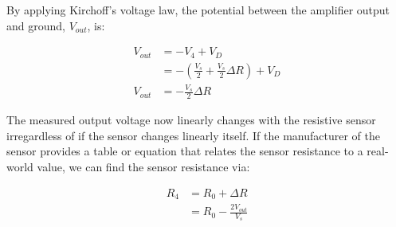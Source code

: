 By applying Kirchoff's voltage law, the potential between the amplifier output and ground, $V_{out} $, is:

\begin{align*}
    V_{out} &= -V_4 + V_D \\
            &= -\left( \frac{V_s}{2} + \frac{V_s}{2} \Delta R\right) + V_D \\
    V_{out} &= -\frac{V_s}{2} \Delta R
\end{align*}

The measured output voltage now linearly changes with the resistive sensor irregardless of if the sensor changes linearly itself.
If the manufacturer of the sensor provides a table or equation that relates the sensor resistance to a real-world value, we can find the sensor resistance via:

\begin{align*}
    R_4 &= R_0 + \Delta R \\
        &= R_0 - \frac{2V_{out}}{V_s}
\end{align*}